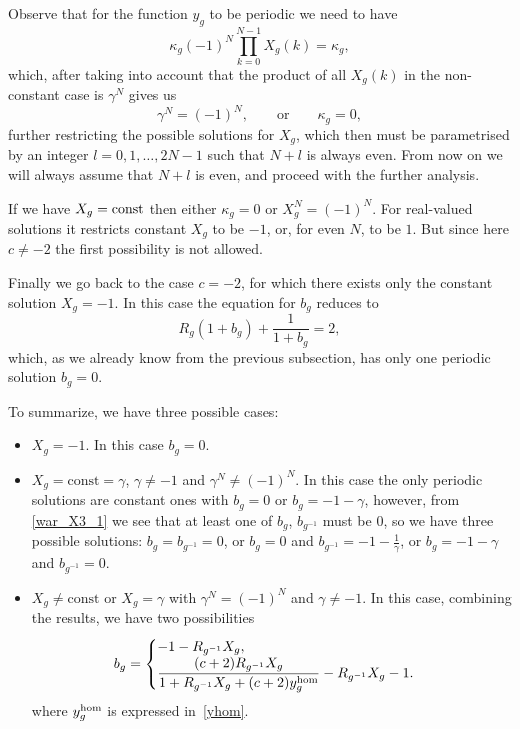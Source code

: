 \documentclass[pdftex]{sigma}
\numberwithin{equation}{section}
\begin{document}
Observe that for the function $y_g$ to be periodic we need to have
\[\kappa_g (-1)^N \prod_{k=0}^{N-1} X_g(k) = \kappa_g, \]
which, after taking into account that the product of all $X_g(k)$ in the non-constant case is $\gamma^N$ gives
us
\[ \gamma^N = (-1)^N, \qquad \text{or} \qquad \kappa_g=0,\]
further restricting the possible solutions for $X_g$, which then must be parametrised by an integer $l =0,1,\ldots, 2N-1$ such that $N+l$ is always even.
From now on we will always assume that $N+l$ is even, and proceed with the further analysis.

If we have $X_g=\hbox{const}$ then either $\kappa_g=0$ or $X_g^N=(-1)^N$. For real-valued solutions it restricts constant $X_g$ to be $-1$, or, for even $N$, to be $1$. But since here $c \neq -2$ the first possibility is not allowed.

Finally we go back to the case $c=-2$, for which there exists only the constant solution $X_g=-1$. In this case the equation for $b_g$
reduces to
\[
R_g(1+b_g)+\frac{1}{1+b_g}=2,
\]
which, as we already know from the previous subsection, has only one periodic solution $b_g=0$.

To summarize, we have three possible cases:
\begin{itemize}\itemsep=0pt
\item ${X_g = -1}$. In this case $b_g=0$.

\item ${X_g = \text{const}=\gamma}$, ${\gamma \not=-1}$ and ${\gamma^N\neq (-1)^N}$.
In this case the only periodic solutions are constant ones with $b_g=0$ or $b_g=-1-\gamma$, however,
from \eqref{war_X3_1} we see that at least one of $b_g$, $b_{g^{-1}}$ must be $0$, so we have
three possible solutions: $b_g=b_{g^{-1}}=0$, or
$b_g=0$ and $b_{g^{-1}}=-1-\frac{1}{\gamma}$, or $b_g=-1-\gamma$ and $b_{g^{-1}}=0$.

\item ${X_g \not= \text{const}}$ or ${X_g=\gamma}$ with ${\gamma^N=(-1)^N}$ and ${\gamma\neq -1}$.
In this case, combining the results, we have two possibilities
\begin{equation*}
b_g =
\begin{cases}
-1-R_{g^{-1}} X_g, \\
\dfrac{(c+2) R_{g^{-1}}X_g}{1+R_{g^{-1}} X_g+ (c+2) y^{{\rm hom}}_g}-R_{g^{-1}}X_g-1.
\end{cases}
\end{equation*}
where $y^{{\rm hom}}_g$ is expressed in~\eqref{yhom}.
\end{itemize}
\end{document}
